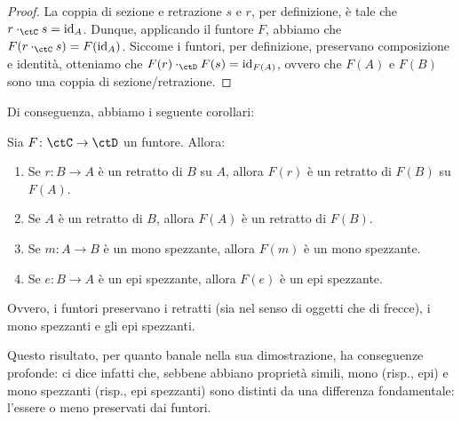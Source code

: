 \begin{proof}
 La coppia di sezione e retrazione \(s\) e \(r\),	per definizione, è tale che \(r \cmp_{\ctC} s = \id_A\).	Dunque, applicando il funtore \(F\), abbiamo che \(F(r \cmp_{\ctC} s) = F(\id_A)\).	Siccome i funtori, per definizione, preservano composizione e identità,	otteniamo che \(F(r) \cmp_{\ctD} F(s) = \id_{F(A)}\),	ovvero che \(F(A)\) e \(F(B)\) sono una coppia di sezione/retrazione.
\end{proof}
Di conseguenza, abbiamo i seguente corollari:
\begin{corollary}
 \label{cor:fun-sezioni-retrazioni}
 Sia \(F \colon \ctC \to \ctD\) un funtore.	Allora:
 \begin{enumerate}
  \item Se \(r \colon B \to A\) è un retratto di \(B\) su \(A\), allora \(F(r)\) è un retratto di \(F(B)\) su \(F(A)\).
  \item Se \(A\) è un retratto di \(B\), allora \(F(A)\) è un retratto di \(F(B)\).
  \item Se \(m \colon A \to B\) è un mono spezzante, allora \(F(m)\) è un mono spezzante.
  \item Se \(e \colon B \to A\) è un epi spezzante, allora \(F(e)\) è un epi spezzante.
 \end{enumerate}
 Ovvero, i funtori preservano i retratti (sia nel senso di oggetti che di frecce), i mono spezzanti e gli epi spezzanti.
\end{corollary}
Questo risultato, per quanto banale nella sua dimostrazione, ha conseguenze profonde: ci dice infatti che, sebbene abbiano proprietà simili, mono (risp., epi) e mono spezzanti (risp., epi spezzanti) sono distinti da una differenza fondamentale: l'essere o meno preservati dai funtori.

